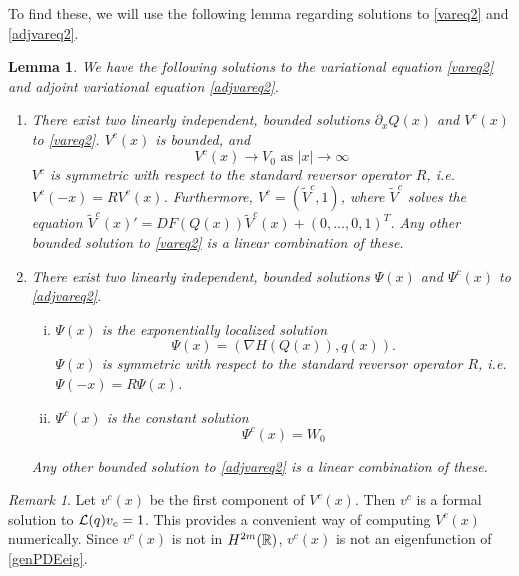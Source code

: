 \documentclass[11pt,reqno]{amsart}
\theoremstyle{plain}
\newtheorem{lemma}[theorem]{Lemma}
\theoremstyle{definition}
\theoremstyle{remark}
\newtheorem{remark}[theorem]{Remark}
\begin{document}
To find these, we will use the following lemma regarding solutions to \eqref{vareq2} and \eqref{adjvareq2}.

\begin{lemma}\label{varadjsolutions}
We have the following solutions to the variational equation \cref{vareq2} and adjoint variational equation \cref{adjvareq2}.
\begin{enumerate}
	\item There exist two linearly independent, bounded solutions $\partial_x Q(x)$ and $V^c(x)$ to \eqref{vareq2}. $V^c(x)$ is bounded, and
	\begin{equation}
	V^c(x) \rightarrow V_0 \text{ as }|x| \rightarrow \infty
	\end{equation}
	$V^c$ is symmetric with respect to the standard reversor operator $R$, i.e. $V^c(-x) = R V^c(x)$. Furthermore, $V^c = (\tilde{V}^c, 1)$, where $\tilde{V}^c$ solves the equation $\tilde{V}^c(x)' = DF(Q(x)) \tilde{V}^c(x) + (0, \dots, 0, 1)^T$. Any other bounded solution to \eqref{vareq2} is a linear combination of these.

	\item There exist two linearly independent, bounded solutions $\Psi(x)$ and $\Psi^c(x)$ to \eqref{adjvareq2}.
	\begin{enumerate}[(i)]
	\item $\Psi(x)$ is the exponentially localized solution
	\begin{equation}\label{psicomponents}
	\Psi(x) = (\nabla H(Q(x)), q(x)).
	\end{equation}
	$\Psi(x)$ is symmetric with respect to the standard reversor operator $R$, i.e. $\Psi(-x) = R \Psi(x)$. 
	\item $\Psi^c(x)$ is the constant solution
	\begin{equation}
	\Psi^c(x) = W_0
	\end{equation}
	\end{enumerate}
	Any other bounded solution to \eqref{adjvareq2} is a linear combination of these.
\end{enumerate}
\end{lemma}

\begin{remark}\label{remark:computeVc}
Let $v^c(x)$ be the first component of $V^c(x)$. Then $v^c$ is a formal solution to $\mathcal{L}(q) v_c = 1$. This provides a convenient way of computing $V^c(x)$ numerically. Since $v^c(x)$ is not in $H^{2m}(\mathbb{R})$, $v^c(x)$ is not an eigenfunction of \cref{genPDEeig}.
\end{remark}
\end{document}
